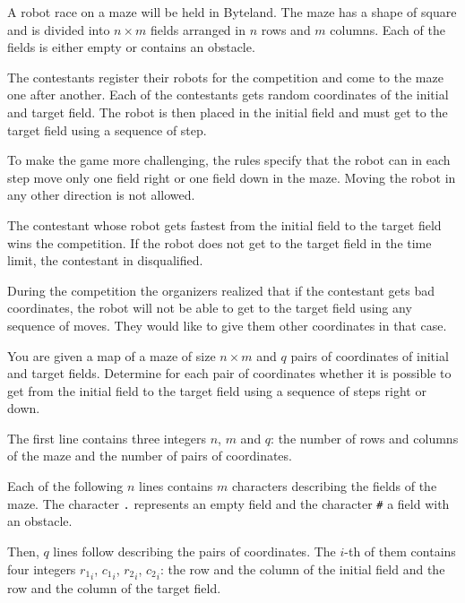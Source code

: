 





A robot race on a maze will be held in Byteland. The maze has a shape of square and is divided into $n \times m$ fields arranged in $n$ rows and $m$ columns. Each of the fields is either empty or contains an obstacle.

The contestants register their robots for the competition and come to the maze one after another. Each of the contestants gets random coordinates of the initial and target field. The robot is then placed in the initial field and must get to the target field using a sequence of step.

To make the game more challenging, the rules specify that the robot can in each step move only one field right or one field down in the maze. Moving the robot in any other direction is not allowed.

The contestant whose robot gets fastest from the initial field to the target field wins the competition. If the robot does not get to the target field in the time limit, the contestant in disqualified.

During the competition the organizers realized that if the contestant gets bad coordinates, the robot will not be able to get to the target field using any sequence of moves. They would like to give them other coordinates in that case.


You are given a map of a maze of size $n \times m$ and $q$ pairs of coordinates of initial and target fields. Determine for each pair of coordinates whether it is possible to get from the initial field to the target field using a sequence of steps right or down.


The first line contains three integers $n$, $m$ and $q$: the number of rows and columns of the maze and the number of pairs of coordinates.

Each of the following $n$ lines contains $m$ characters describing the fields of the maze. The character \texttt{.} represents an empty field and the character \texttt{#} a field with an obstacle.

Then, $q$ lines follow describing the pairs of coordinates. The $i$-th of them contains four integers ${r_1}_i$, ${c_1}_i$, ${r_2}_i$, ${c_2}_i$: the row and the column of the initial field and the row and the column of the target field.

